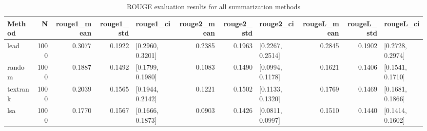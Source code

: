 \begin{table}
\caption{ROUGE evaluation results for all summarization methods}
\label{tab:rouge_results}
\begin{tabular}{lrrrlrrlrrl}
\toprule
Method & N & rouge1_mean & rouge1_std & rouge1_ci & rouge2_mean & rouge2_std & rouge2_ci & rougeL_mean & rougeL_std & rougeL_ci \\
\midrule
lead & 1000 & 0.3077 & 0.1922 & [0.2960, 0.3201] & 0.2385 & 0.1963 & [0.2267, 0.2514] & 0.2845 & 0.1902 & [0.2728, 0.2974] \\
random & 1000 & 0.1887 & 0.1492 & [0.1799, 0.1980] & 0.1083 & 0.1490 & [0.0994, 0.1178] & 0.1621 & 0.1406 & [0.1541, 0.1710] \\
textrank & 1000 & 0.2039 & 0.1565 & [0.1944, 0.2142] & 0.1221 & 0.1502 & [0.1133, 0.1320] & 0.1769 & 0.1469 & [0.1681, 0.1866] \\
lsa & 1000 & 0.1770 & 0.1567 & [0.1666, 0.1873] & 0.0903 & 0.1426 & [0.0811, 0.0997] & 0.1510 & 0.1440 & [0.1414, 0.1602] \\
\bottomrule
\end{tabular}
\end{table}
